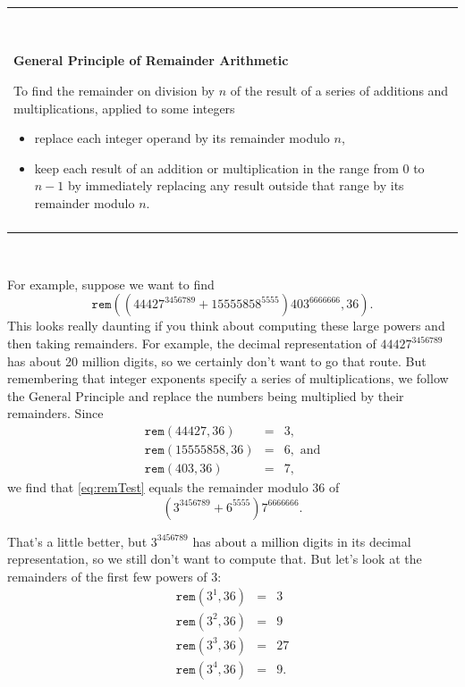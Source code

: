 \documentclass[11pt,oneside]{book}
\theoremstyle{definition}
\begin{document}
\noindent\begin{tabular}{|p{6.5in}|}
    \hline
    \

    \textbf{\huge General Principle of Remainder Arithmetic}

    To find the remainder on division by $n$ of the result of a series of additions and multiplications, applied to some integers
    \begin{itemize}
        \item replace each integer operand by its remainder modulo $n$,

        \item keep each result of an addition or multiplication in the range from 0 to $n - 1$ by immediately replacing any result outside that range by its remainder modulo $n$.
    \end{itemize}

    \\\\
    \hline
\end{tabular}

\

For example, suppose we want to find
\begin{equation} \texttt{rem}((44427^{3456789} + 15555858^{5555})403^{6666666}, 36). \label{eq:remTest} \end{equation}
This looks really daunting if you think about computing these large powers and then taking remainders.
For example, the decimal representation of $44427^{3456789}$ has about 20 million digits, so we certainly don't want to go that route.
But remembering that integer exponents specify a series of multiplications, we follow the General Principle and replace the numbers being multiplied by their remainders.
Since
\[\begin{array}{lcl}
    \texttt{rem}(44427, 36) &=& 3, \\
    \texttt{rem}(15555858, 36) &=& 6, \text{ and} \\
    \texttt{rem}(403, 36) &=& 7,
\end{array}\]
we find that \eqref{eq:remTest} equals the remainder modulo 36 of
\begin{equation} (3^{3456789} + 6^{5555})7^{6666666}. \label{eq:remTest2} \end{equation}

That's a little better, but $3^{3456789}$ has about a million digits in its decimal representation, so we still don’t want to compute that.
But let's look at the remainders of the first few powers of 3:
\[\begin{array}{lcl}
    \texttt{rem}(3^{1}, 36) &=& 3 \\
    \texttt{rem}(3^{2}, 36) &=& 9 \\
    \texttt{rem}(3^{3}, 36) &=& 27 \\
    \texttt{rem}(3^{4}, 36) &=& 9.
\end{array}\]
\end{document}
